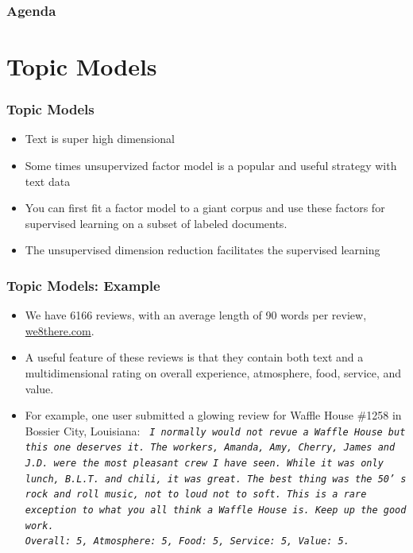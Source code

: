 \documentclass[
  shownotes,
  xcolor={svgnames},
  hyperref={colorlinks,citecolor=DarkBlue,linkcolor=DarkRed,urlcolor=DarkBlue}
  , aspectratio=169]{beamer}
\begin{document}

\begin{frame}
\frametitle{Agenda}

\tableofcontents

\end{frame}

\section{Topic Models}
\begin{frame}
\frametitle{Topic Models}

\begin{itemize}
\item Text is super high dimensional
\medskip
\item Some times unsupervized factor model is a popular and useful strategy with text data
\medskip
\item You can first fit a factor model to a giant corpus and use these factors for supervised learning on a subset of labeled documents.
\medskip
\item The unsupervised dimension reduction facilitates the supervised learning
\end{itemize}
\end{frame}
\begin{frame}
\frametitle{Topic Models: Example}

\begin{itemize}


\item We have 6166 reviews, with an average length of 90 words per review, \url{we8there.com}. 
\medskip
\item A useful feature of these reviews is that they contain both text and a multidimensional rating on overall experience, atmosphere, food, service, and value. 
\medskip
\item For example, one user submitted a glowing review for Waffle House \#1258 in Bossier City, Louisiana: 
\medskip
{\tt \it 
I normally would not revue a Waffle House but this one deserves it. The workers, Amanda, Amy, Cherry, James and J.D. were the most pleasant crew I have seen. While it was only lunch, B.L.T. and chili, it was great. The best thing was the 50’ s rock and roll music, not to loud not to soft. This is a rare exception to what you all think a Waffle House is. Keep up the good work. \\
Overall: 5, Atmosphere: 5, Food: 5, Service: 5, Value: 5. 
}
\end{itemize}
\end{frame}
\end{document}
